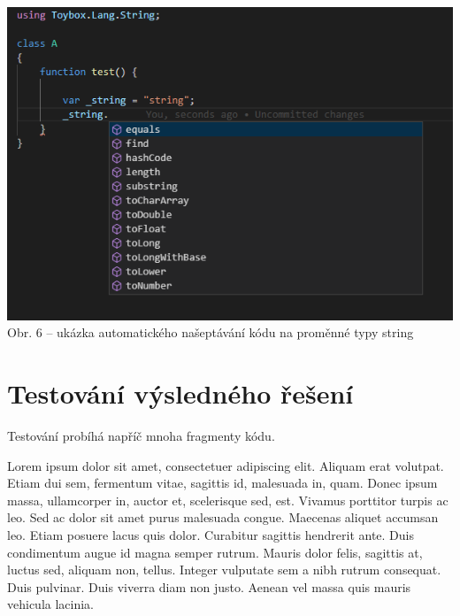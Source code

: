 \documentclass[czech,master,dept460,male,cpp,cpdeclaration]{diploma}
\begin{document}
\begin{center}
	\includegraphics[scale=1]{autocomplete_example}
	\\	
	Obr. 6 – ukázka automatického našeptávání kódu na proměnné typy string
\end{center}


\section{Testování výsledného řešení}
Testování probíhá napříč mnoha fragmenty kódu.


Lorem ipsum dolor sit amet, consectetuer adipiscing elit. Aliquam erat volutpat. Etiam dui sem, fermentum vitae, sagittis id, malesuada in, quam. Donec ipsum massa, ullamcorper in, auctor et, scelerisque sed, est. Vivamus porttitor turpis ac leo. Sed ac dolor sit amet purus malesuada congue. Maecenas aliquet accumsan leo. Etiam posuere lacus quis dolor. Curabitur sagittis hendrerit ante. Duis condimentum augue id magna semper rutrum. Mauris dolor felis, sagittis at, luctus sed, aliquam non, tellus. Integer vulputate sem a nibh rutrum consequat. Duis pulvinar. Duis viverra diam non justo. Aenean vel massa quis mauris vehicula lacinia.
\end{document}
